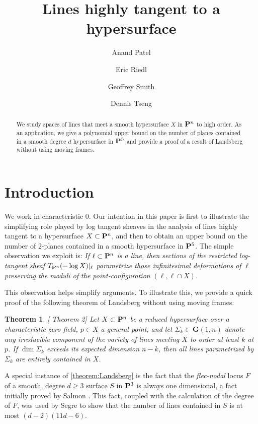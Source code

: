 \documentclass[12pt,reqno]{amsart}
\title{Lines highly tangent to a hypersurface}
\author{Anand Patel}
\author{Eric Riedl}
\author{Geoffrey Smith}
\author{Dennis Tseng}
\theoremstyle{plain}
\newtheorem{theorem}{Theorem}[section]
\theoremstyle{remark}
\numberwithin{equation}{section}
\DeclareMathOperator{\dm}{dim}
\renewcommand {\P}{{\bf P}}
\numberwithin{equation}{section}
\newcommand{\G}{\mathbf G}
\begin{document}
\begin{abstract}We study spaces of lines that meet a smooth hypersurface $X$ in $\P^n$ to high order. As an application, we give a polynomial upper bound on the number of planes contained in a smooth degree $d$ hypersurface in $\P^5$ and provide a proof of a result of Landsberg without using moving frames.
\end{abstract}
\maketitle

\section{Introduction}


\label{sec:introduction}

We work in characteristic 0. Our intention in this paper is first to illustrate the simplifying
role played by log tangent sheaves in the analysis of lines highly
tangent to a hypersurface $X \subset \P^n$, and then to obtain an
upper bound on the number of $2$-planes contained in a smooth
hypersurface in $\P^5$.  The simple observation we exploit is: {\sl If
  $\ell \subset \P^n$ is a line, then sections of the restricted
  log-tangent sheaf $T_{\P^n}(- \log X)|_{\ell}$ parametrize those
  infinitesimal deformations of $\ell$ preserving the moduli of the
  point-configuration $\left(\ell,\ell \cap X \right)$.}


This observation helps simplify arguments.  To illustrate this, we
provide a quick proof of the following theorem of Landsberg without
using moving frames:

\begin{theorem}
  \label{theorem:Landsberg}[\cite{Landsberg} Theorem 2] Let $X \subset \P^{n}$ be a reduced
  hypersurface over a characteristic zero field, $p \in X$ a general
  point, and let $\Sigma_{k} \subset \G(1,n)$ denote any irreducible
  component of the variety of lines meeting $X$ to order at least $k$
  at $p$.  If $\dm \Sigma_{k}$ exceeds its expected dimension $n-k$,
  then all lines parametrized by $\Sigma_{k}$ are entirely contained
  in $X$.
\end{theorem}



A special instance of \autoref{theorem:Landsberg} is the fact that the
{\sl flec-nodal} locus $F$ of a smooth, degree $d \geq 3$ surface $S$
in $\P^{3}$ is always one dimensional, a fact initially proved by Salmon \cite{salmon}.  This fact, coupled with the
calculation of the degree of $F$, was used by Segre \cite{Segre} to show that the number of lines contained in $S$ is at most $(d-2)(11d-6)$.
\end{document}
